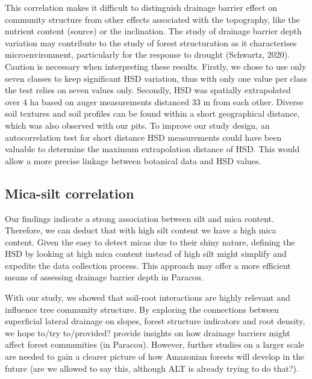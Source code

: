 \documentclass[fleqn,12pt]{latex/stylish_article} %
\begin{document}
This correlation makes it difficult to distinguish drainage barrier effect on community structure from other effects associated with the topography, like the nutrient content (source) or the inclination. The study of drainage barrier depth variation may contribute to the study of forest structuration as it characterises microenvironment, particularly for the response to drought (Schwartz, 2020).
Caution is necessary when interpreting these results. Firstly, we chose to use only seven classes to keep significant HSD variation, thus with only one value per class the test relies on seven values only. Secondly, HSD was spatially extrapolated over 4 ha based on auger measurements distanced 33 m from each other. Diverse soil textures and soil profiles can be found within a short geographical distance, which was also observed with our pits. To improve our study design, an autocorrelation test for short distance HSD measurements could have been valuable to determine the maximum extrapolation distance of HSD. This would allow a more precise linkage between botanical data and HSD values.

\hypertarget{mica-silt-correlation}{%
\subsection{Mica-silt correlation}\label{mica-silt-correlation}}

Our findings indicate a strong association between silt and mica content. Therefore, we can deduct that with high silt content we have a high mica content. Given the easy to detect micas due to their shiny nature, defining the HSD by looking at high mica content instead of high silt might simplify and expedite the data collection process. This approach may offer a more efficient means of assessing drainage barrier depth in Paracou.

With our study, we showed that soil-root interactions are highly relevant and influence tree community structure. By exploring the connections between superficial lateral drainage on slopes, forest structure indicators and root density, we hope to/try to/provided? provide insights on how drainage barriers might affect forest communities (in Paracou). However, further studies on a larger scale are needed to gain a clearer picture of how Amazonian forests will develop in the future (are we allowed to say this, although ALT is already trying to do that?).



\makeatletter

\makeatother


\end{document}
